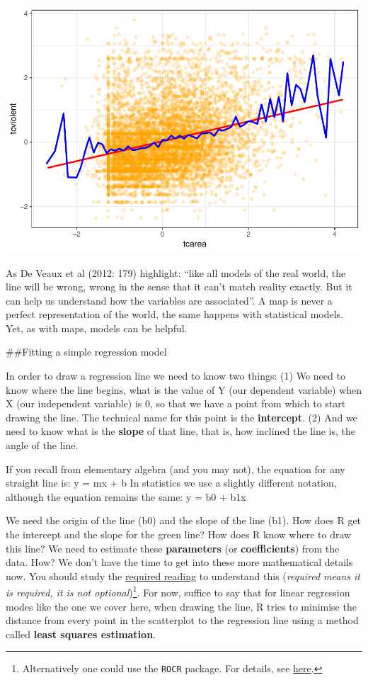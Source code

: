 \documentclass[]{book}
\let\rmarkdownfootnote\footnote%
\def\footnote{\protect\rmarkdownfootnote}
\theoremstyle{definition}
\theoremstyle{definition}
\theoremstyle{definition}
\theoremstyle{remark}
\begin{document}
\includegraphics{08-regression_files/figure-latex/unnamed-chunk-8-1.pdf}

As De Veaux et al (2012: 179) highlight: ``like all models of the real
world, the line will be wrong, wrong in the sense that it can't match
reality exactly. But it can help us understand how the variables are
associated''. A map is never a perfect representation of the world, the
same happens with statistical models. Yet, as with maps, models can be
helpful.

\#\#Fitting a simple regression model

In order to draw a regression line we need to know two things: (1) We
need to know where the line begins, what is the value of Y (our
dependent variable) when X (our independent variable) is 0, so that we
have a point from which to start drawing the line. The technical name
for this point is the \textbf{intercept}. (2) And we need to know what
is the \textbf{slope} of that line, that is, how inclined the line is,
the angle of the line.

If you recall from elementary algebra (and you may not), the equation
for any straight line is: y = mx + b In statistics we use a slightly
different notation, although the equation remains the same: y = b0 + b1x

We need the origin of the line (b0) and the slope of the line (b1). How
does R get the intercept and the slope for the green line? How does R
know where to draw this line? We need to estimate these
\textbf{parameters} (or \textbf{coefficients}) from the data. How? We
don't have the time to get into these more mathematical details now. You
should study the
\href{http://link.springer.com/chapter/10.1007/978-1-4614-7138-7_3}{required
reading} to understand this (\emph{required means it is required, it is
not optional})\footnote{Alternatively one could use the \texttt{ROCR}
  package. For details, see
  \href{http://rocr.bioinf.mpi-sb.mpg.de/}{here}.}. For now, suffice to
say that for linear regression modes like the one we cover here, when
drawing the line, R tries to minimise the distance from every point in
the scatterplot to the regression line using a method called
\textbf{least squares estimation}.
\end{document}
